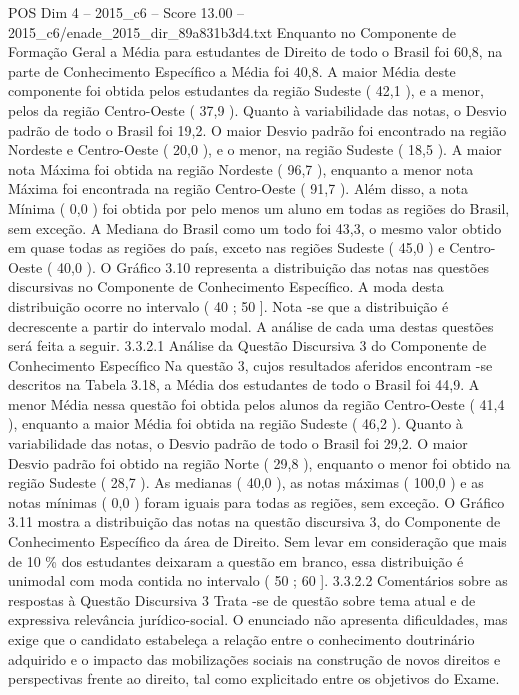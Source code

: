 \begin{textsample}{POS Dim 4 – 2015\_c6 – Score 13.00 – 2015\_c6/enade\_2015\_dir\_89a831b3d4.txt}
Enquanto no Componente de Formação Geral a Média para estudantes de Direito de todo o Brasil foi 60,8, na parte de Conhecimento Específico a Média foi 40,8.
A maior Média deste componente foi obtida pelos estudantes da região Sudeste ( 42,1 ), e a menor, pelos da região Centro-Oeste ( 37,9 ).
Quanto à variabilidade das notas, o Desvio padrão de todo o Brasil foi 19,2.
O maior Desvio padrão foi encontrado na região Nordeste e Centro-Oeste ( 20,0 ), e o menor, na região Sudeste ( 18,5 ).
A maior nota Máxima foi obtida na região Nordeste ( 96,7 ), enquanto a menor nota Máxima foi encontrada na região Centro-Oeste ( 91,7 ).
Além disso, a nota Mínima ( 0,0 ) foi obtida por pelo menos um aluno em todas as regiões do Brasil, sem exceção.
A Mediana do Brasil como um todo foi 43,3, o mesmo valor obtido em quase todas as regiões do país, exceto nas regiões Sudeste ( 45,0 ) e Centro-Oeste ( 40,0 ).
O Gráfico 3.10 representa a distribuição das notas nas questões discursivas no Componente de Conhecimento Específico.
A moda desta distribuição ocorre no intervalo ( 40 ; 50 ].
Nota -se que a distribuição é decrescente a partir do intervalo modal.
A análise de cada uma destas questões será feita a seguir. 3.3.2.1 Análise da Questão Discursiva 3 do Componente de Conhecimento Específico Na questão 3, cujos resultados aferidos encontram -se descritos na Tabela 3.18, a Média dos estudantes de todo o Brasil foi 44,9.
A menor Média nessa questão foi obtida pelos alunos da região Centro-Oeste ( 41,4 ), enquanto a maior Média foi obtida na região Sudeste ( 46,2 ).
Quanto à variabilidade das notas, o Desvio padrão de todo o Brasil foi 29,2.
O maior Desvio padrão foi obtido na região Norte ( 29,8 ), enquanto o menor foi obtido na região Sudeste ( 28,7 ).
As medianas ( 40,0 ), as notas máximas ( 100,0 ) e as notas mínimas ( 0,0 ) foram iguais para todas as regiões, sem exceção.
O Gráfico 3.11 mostra a distribuição das notas na questão discursiva 3, do Componente de Conhecimento Específico da área de Direito.
Sem levar em consideração que mais de 10 \% dos estudantes deixaram a questão em branco, essa distribuição é unimodal com moda contida no intervalo ( 50 ; 60 ]. 3.3.2.2 Comentários sobre as respostas à Questão Discursiva 3 Trata -se de questão sobre tema atual e de expressiva relevância jurídico-social.
O enunciado não apresenta dificuldades, mas exige que o candidato estabeleça a relação entre o conhecimento doutrinário adquirido e o impacto das mobilizações sociais na construção de novos direitos e perspectivas frente ao direito, tal como explicitado entre os objetivos do Exame.

\end{textsample}
